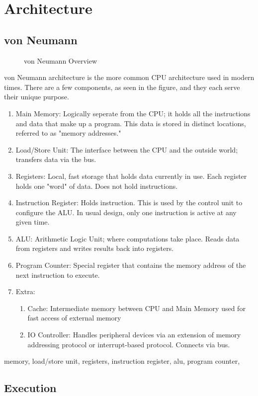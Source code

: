 \section{Architecture}
\subsection{von Neumann}
\begin{figure}[!htb]
	\caption{\label{fig:vonover} von Neumann Overview}
\end{figure}
von Neumann architecture is the more common CPU architecture used in modern times. There are a few components, as seen in the figure, and they each serve their unique purpose.
\begin{enumerate}
	\item Main Memory: Logically seperate from the CPU; it holds all the instructions and data that make up a program. This data is stored in distinct locations, referred to as "memory addresses."
	\item Load/Store Unit: The interface between the CPU and the outside world; transfers data via the bus.
	\item Registers: Local, fast storage that holds data currently in use. Each register holds one "word" of data. Does not hold instructions.
	\item Instruction Register: Holds instruction. This is used by the control unit to configure the ALU. In usual design, only one instruction is active at any given time.
	\item ALU: Arithmetic Logic Unit; where computations take place. Reads data from registers and writes results back into registers.
	\item Program Counter: Special register that contains the memory address of the next instruction to execute.
	\item Extra:
	\begin{enumerate}
		\item Cache: Intermediate memory between CPU and Main Memory used for fast access of external memory
		\item IO Controller: Handles peripheral devices via an extension of memory addressing protocol or interrupt-based protocol. Connects via bus.
	\end{enumerate}
\end{enumerate}
memory, load/store unit, registers, instruction register, alu, program counter, 

\subsection{Execution}
